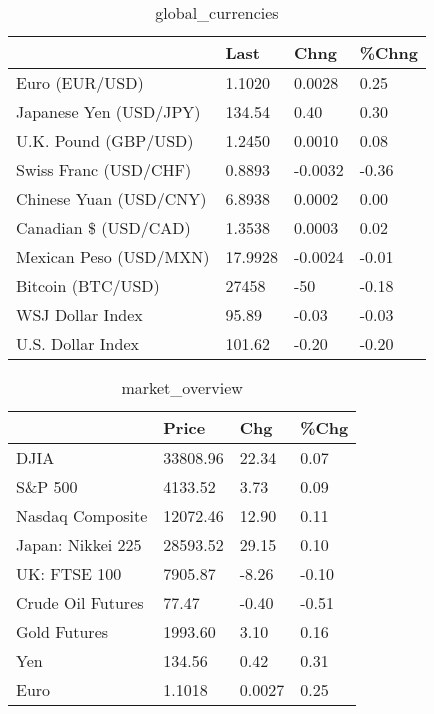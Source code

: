 \documentclass{article}%
\begin{document}
%


\begin{table}[htbp]%
\caption{global\_currencies}%
\centering%
\begin{adjustbox}{width=1\textwidth}%
\begin{tabular}{llll}
\toprule
                       &    Last &    Chng & \%Chng \\
\midrule
        Euro (EUR/USD) &  1.1020 &  0.0028 &  0.25 \\
Japanese Yen (USD/JPY) &  134.54 &    0.40 &  0.30 \\
  U.K. Pound (GBP/USD) &  1.2450 &  0.0010 &  0.08 \\
 Swiss Franc (USD/CHF) &  0.8893 & -0.0032 & -0.36 \\
Chinese Yuan (USD/CNY) &  6.8938 &  0.0002 &  0.00 \\
  Canadian \$ (USD/CAD) &  1.3538 &  0.0003 &  0.02 \\
Mexican Peso (USD/MXN) & 17.9928 & -0.0024 & -0.01 \\
     Bitcoin (BTC/USD) &   27458 &     -50 & -0.18 \\
      WSJ Dollar Index &   95.89 &   -0.03 & -0.03 \\
     U.S. Dollar Index &  101.62 &   -0.20 & -0.20 \\
\bottomrule
\end{tabular}
%
\end{adjustbox}%
\end{table}

%


\begin{table}[htbp]%
\caption{market\_overview}%
\centering%
\begin{adjustbox}{width=1\textwidth}%
\begin{tabular}{llll}
\toprule
                  &    Price &    Chg &  \%Chg \\
\midrule
             DJIA & 33808.96 &  22.34 &  0.07 \\
          S\&P 500 &  4133.52 &   3.73 &  0.09 \\
 Nasdaq Composite & 12072.46 &  12.90 &  0.11 \\
Japan: Nikkei 225 & 28593.52 &  29.15 &  0.10 \\
     UK: FTSE 100 &  7905.87 &  -8.26 & -0.10 \\
Crude Oil Futures &    77.47 &  -0.40 & -0.51 \\
     Gold Futures &  1993.60 &   3.10 &  0.16 \\
              Yen &   134.56 &   0.42 &  0.31 \\
             Euro &   1.1018 & 0.0027 &  0.25 \\
\bottomrule
\end{tabular}
%
\end{adjustbox}%
\end{table}

%
\end{document}
